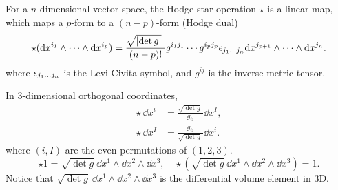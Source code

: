 \documentclass[10pt]{article}
\begin{document}
	\begin{definition}
		For a $n$-dimensional vector space, the Hodge star operation $\star$ is a linear map, which maps a $p$-form to a $(n-p)$-form (Hodge dual)
		\begin{equation}
			\star (\dd x^{i_1} \wedge \cdots \wedge \dd x^{i_p}) = \frac{\sqrt{\abs{\det g}}~}{(n-p)!} g^{i_1 j_1} \cdots g^{i_p j_p} \epsilon_{j_1 \dots j_n} \dd x^{j_{p+1}} \wedge \cdots \wedge \dd x^{j_n}.
		\end{equation}
		where $\epsilon_{j_1 \dots j_n}$ is the Levi-Civita symbol, and $g^{ij}$ is the inverse metric tensor.
	\end{definition}

	In 3-dimensional orthogonal coordinates,
	\begin{align}
		\star~\dd x^i &= \frac{\sqrt{\det g}~}{g_{ii}} \dd x^I, \\
		\star~\dd x^I &= \frac{g_{ii}}{\sqrt{\det g}~} \dd x^i.
	\end{align}
	where $(i, I)$ are the even permutations of $(1,2,3)$.
	\begin{equation}
		\star 1 = \sqrt{\det g}~\dd x^1 \wedge \dd x^2 \wedge \dd x^3, \quad
		\star (\sqrt{\det g}~\dd x^1 \wedge \dd x^2 \wedge \dd x^3) = 1.
	\end{equation}
	Notice that $\sqrt{\det g}~\dd x^1 \wedge \dd x^2 \wedge \dd x^3$ is the differential volume element in 3D.
\end{document}
